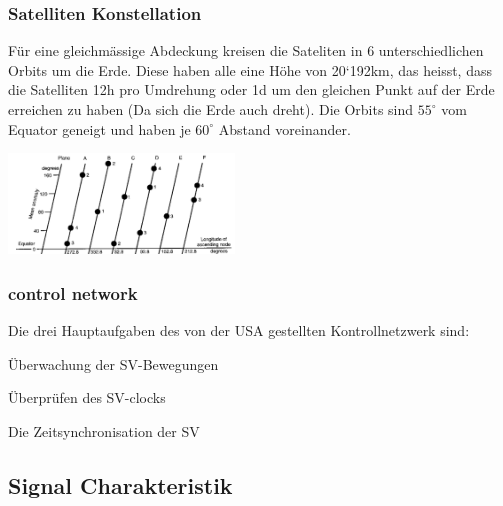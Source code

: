     \begin{minipage}{13cm}
    \subsubsection{Satelliten Konstellation}    
	    Für eine gleichmässige Abdeckung kreisen die Sateliten in 6 unterschiedlichen
	    Orbits um die Erde. Diese haben alle eine Höhe von 20`192km, das
	    heisst, dass die Satelliten 12h pro Umdrehung oder 1d um den gleichen Punkt auf
	    der Erde erreichen zu haben (Da sich die Erde auch dreht). Die Orbits sind
	    $55^\circ$ vom Equator geneigt und haben je $60^\circ$ Abstand voreinander.    
    \end{minipage}
    \begin{minipage}{6cm}    
        \includegraphics[width=6cm]{./bilder/GPS-SatConstellation.png}    
    \end{minipage}
	
	\subsubsection{control network}
	Die drei Hauptaufgaben des von der USA gestellten Kontrollnetzwerk sind:
	\begin{liste}
    	\item Überwachung der SV-Bewegungen
    	\item Überprüfen des SV-clocks
    	\item Die Zeitsynchronisation der SV
    \end{liste} 
\subsection{Signal Charakteristik}

